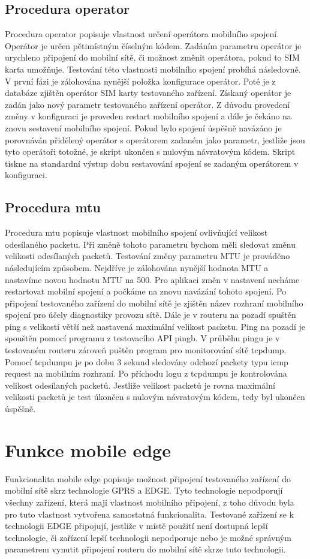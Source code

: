 \subsection{Procedura operator}
Procedura operator popisuje vlastnost určení operátora mobilního spojení. Operátor je určen pětimístným číselným kódem. Zadáním parametru operátor je urychleno připojení do mobilní sítě, či možnost změnit operátora, pokud to SIM karta umožňuje. Testování této vlastnosti mobilního spojení probíhá následovně. V první fázi je zálohována nynější položka konfigurace operátor. Poté je z databáze zjištěn operátor SIM karty testovaného zařízení. Získaný operátor je zadán jako nový parametr testovaného zařízení operátor. Z důvodu provedení změny v konfiguraci je proveden restart mobilního spojení a dále je čekáno na znovu sestavení mobilního spojení. Pokud bylo spojení úspěšně navázáno je porovnáván přidělený operátor s operátorem zadaném jako parametr, jestliže jsou tyto operátoři totožné, je skript ukončen s nulovým návratovým kódem. Skript tiskne na standardní výstup dobu sestavování spojení se zadaným operátorem v konfiguraci.

\subsection{Procedura mtu}
Procedura mtu popisuje vlastnost mobilního spojení ovlivňující velikost odesílaného packetu. Při změně tohoto parametru bychom měli sledovat změnu velikosti odesílaných packetů. Testování změny parametru MTU je prováděno následujícím způsobem. Nejdříve je zálohována nynější hodnota MTU a nastavíme novou hodnotu MTU na 500. Pro aplikaci změn v nastavení necháme restartovat mobilní spojení a počkáme na znovu navázání tohoto spojení. Po připojení testovaného zařízení do mobilní sítě je zjištěn název rozhraní mobilního spojení pro účely diagnostiky provozu sítě. Dále je v routeru na pozadí spuštěn ping s velikostí větší než nastavená maximální velikost packetu. Ping na pozadí je spouštěn pomocí programu z testovacího API pingb. V průběhu pingu je v testovaném routeru zároveň puštěn program pro monitorování sítě tcpdump. Pomocí tcpdumpu je po dobu 3 sekund sledovány odchozí packety typu icmp request na mobilním rozhraní. Po příchodu logu z tcpdumpu je kontrolována velikost odesílaných packetů. Jestliže velikost packetů je rovna maximální velikosti packetů je test úkončen s nulovým návratovým kódem, tedy byl ukončen úspěšně.

\section{Funkce mobile edge}
Funkcionalita mobile edge popisuje možnost připojení testovaného zařízení do mobilní sítě skrz technologie GPRS a EDGE. Tyto technologie nepodporují všechny zařízení, která mají vlastnost mobilního připojení, z toho důvodu byla pro tuto vlastnost vytvořena samostatná funkcionalita. Testované zařízení se k technologii EDGE  připojují, jestliže v místě použití není dostupná lepší technologie, či zařízení lepší technologii nepodporuje nebo je možné správným parametrem vynutit připojení routeru do mobilní sítě skrze tuto technologii.

